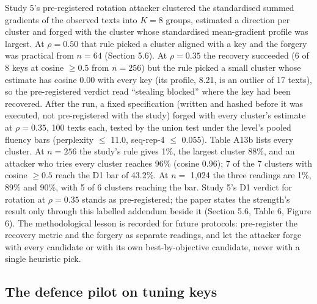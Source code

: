 \documentclass[11pt,letterpaper]{article}
\begin{document}
Study 5's pre-registered rotation attacker clustered the standardised summed gradients of the observed texts into \(K = 8\) groups, estimated a direction per cluster and forged with the cluster whose standardised mean-gradient profile was largest. At \(\rho = 0.50\) that rule picked a cluster aligned with a key and the forgery was practical from \(n = 64\) (Section 5.6). At \(\rho = 0.35\) the recovery succeeded (6 of 8 keys at cosine \(\geq 0.5\) from \(n = 256\)) but the rule picked a small cluster whose estimate has cosine 0.00 with every key (its profile, 8.21, is an outlier of 17 texts), so the pre-registered verdict read ``stealing blocked'' where the key had been recovered. After the run, a fixed specification (written and hashed before it was executed, not pre-registered with the study) forged with every cluster's estimate at \(\rho = 0.35\), 100 texts each, tested by the union test under the level's pooled fluency bars (perplexity \(\leq\) 11.0, seq-rep-4 \(\leq\) 0.055). Table A13b lists every cluster. At \(n = 256\) the study's rule gives 1\%, the largest cluster 88\%, and an attacker who tries every cluster reaches 96\% (cosine 0.96); 7 of the 7 clusters with cosine \(\geq 0.5\) reach the D1 bar of 43.2\%. At \(n =\) 1,024 the three readings are 1\%, 89\% and 90\%, with 5 of 6 clusters reaching the bar. Study 5's D1 verdict for rotation at \(\rho = 0.35\) stands as pre-registered; the paper states the strength's result only through this labelled addendum beside it (Section 5.6, Table 6, Figure 6). The methodological lesson is recorded for future protocols: pre-register the recovery metric and the forgery as separate readings, and let the attacker forge with every candidate or with its own best-by-objective candidate, never with a single heuristic pick.

\hypertarget{the-defence-pilot-on-tuning-keys}{%
\subsection{The defence pilot on tuning keys}\label{the-defence-pilot-on-tuning-keys}}
\end{document}
